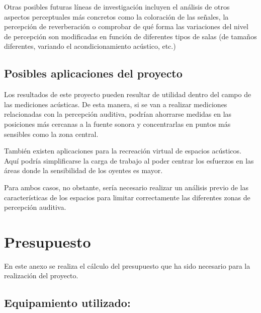 \documentclass[11pt,a4paper]{book}
\begin{document}
        Otras posibles futuras líneas de investigación incluyen el análisis de otros aspectos perceptuales más concretos como la coloración de las señales, la percepción de reverberación o comprobar de qué forma las variaciones del nivel de percepción son modificadas en función de diferentes tipos de salas (de tamaños diferentes, variando el acondicionamiento acústico, etc.)
        
    \section{Posibles aplicaciones del proyecto}
        Los resultados de este proyecto pueden resultar de utilidad dentro del campo de las mediciones acústicas. De esta manera, si se van a realizar mediciones relacionadas con la percepción auditiva, podrían ahorrarse medidas en las posiciones más cercanas a la fuente sonora y concentrarlas en puntos más sensibles como la zona central.
        
        También existen aplicaciones para la recreación virtual de espacios acústicos. Aquí podría simplificarse la carga de trabajo al poder centrar los esfuerzos en las áreas donde la sensibilidad de los oyentes es mayor.
        
        Para ambos casos, no obstante, sería necesario realizar un análisis previo de las características de los espacios para limitar correctamente las diferentes zonas de percepción auditiva. 

\appendix

\chapter{Presupuesto}
En este anexo se realiza el cálculo del presupuesto que ha sido necesario para la realización del proyecto.

    \section*{Equipamiento utilizado:}
\end{document}
